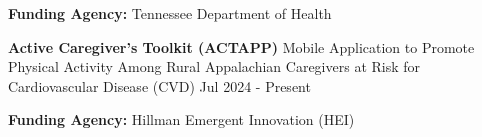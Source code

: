 \documentclass[10pt, letterpaper]{article}
\newenvironment{highlights}{
    \begin{itemize}[
        topsep=0.10 cm,
        parsep=0.10 cm,
        partopsep=0pt,
        itemsep=0pt,
        leftmargin=0 cm + 10pt
    ]
}{
    \end{itemize}
} %
\newenvironment{twocolentry}[2][]{
    \onecolentry
    \def\secondColumn{#2}
    \setcolumnwidth{\fill, 4.5 cm}
    \begin{paracol}{2}
}{
    \switchcolumn \raggedleft \secondColumn
    \end{paracol}
    \endonecolentry
} %
\begin{document}
        \vspace{0.3em} 
            \textbf{Funding Agency:} Tennessee Department of Health
        
        \vspace{0.3cm} \begin{twocolentry}{Jul 2024 - Present} \textbf{Active Caregiver’s Toolkit (ACTAPP)} \textbar Mobile Application to Promote Physical Activity Among Rural Appalachian Caregivers at Risk for Cardiovascular Disease (CVD) \end{twocolentry} 
        
         \textbf{Funding Agency:} Hillman Emergent Innovation (HEI)
\end{document}

